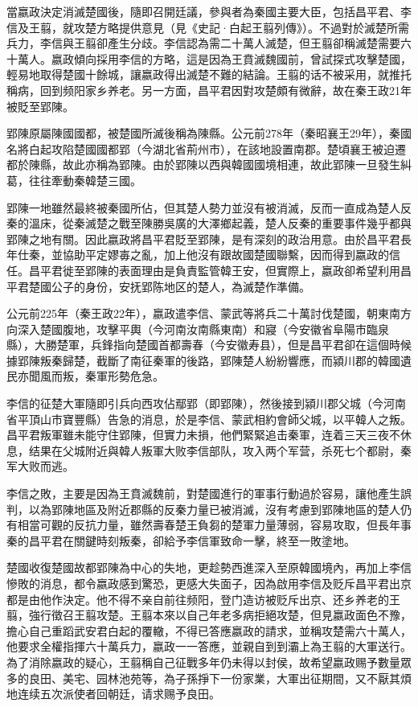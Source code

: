 當嬴政決定消滅楚國後，隨即召開廷議，參與者為秦國主要大臣，包括昌平君、李信及王翦，就攻楚方略提供意見（見《史記·白起王翦列傳》）。不過對於滅楚所需兵力，李信與王翦卻產生分歧。李信認為需二十萬人滅楚，但王翦卻稱滅楚需要六十萬人。嬴政傾向採用李信的方略，這是因為王賁滅魏國前，曾試探式攻擊楚國，輕易地取得楚國十餘城，讓嬴政得出滅楚不難的結論。王翦的话不被采用，就推托稱病，回到频阳家乡养老。另一方面，昌平君因對攻楚頗有微辭，故在秦王政21年被貶至郢陳。

郢陳原屬陳國國都，被楚國所滅後稱為陳縣。公元前278年（秦昭襄王29年），秦國名將白起攻陷楚國國都郢（今湖北省荊州市），在該地設置南郡。楚頃襄王被迫遷都於陳縣，故此亦稱為郢陳。由於郢陳以西與韓國國境相連，故此郢陳一旦發生糾葛，往往牽動秦韓楚三國。

郢陳一地雖然最終被秦國所佔，但其楚人勢力並沒有被消滅，反而一直成為楚人反秦的溫床，從秦滅楚之戰至陳勝吳廣的大澤鄉起義，楚人反秦的重要事件幾乎都與郢陳之地有關。因此嬴政將昌平君貶至郢陳，是有深刻的政治用意。由於昌平君長年仕秦，並協助平定嫪毐之亂，加上他沒有跟故國楚國聯繫，因而得到嬴政的信任。昌平君徙至郢陳的表面理由是負責監管韓王安，但實際上，嬴政卻希望利用昌平君楚國公子的身份，安抚郢陈地区的楚人，為滅楚作準備。

公元前225年（秦王政22年），嬴政遣李信、蒙武等將兵二十萬討伐楚國，朝東南方向深入楚國腹地，攻擊平輿（今河南汝南縣東南）和寢（今安徽省阜陽市臨泉縣），大勝楚軍，兵鋒指向楚國首都壽春（今安徽寿县），但是昌平君卻在這個時候據郢陳叛秦歸楚，截斷了南征秦軍的後路，郢陳楚人紛紛響應，而潁川郡的韓國遺民亦聞風而叛，秦軍形勢危急。

李信的征楚大軍隨即引兵向西攻佔鄢郢（即郢陳），然後接到潁川郡父城（今河南省平頂山市寶豐縣）告急的消息，於是李信、蒙武相約會師父城，以平韓人之叛。昌平君叛軍雖未能守住郢陳，但實力未損，他們緊緊追击秦軍，连着三天三夜不休息，结果在父城附近與韓人叛軍大败李信部队，攻入两个军营，杀死七个都尉，秦军大败而逃。

李信之敗，主要是因為王賁滅魏前，對楚國進行的軍事行動過於容易，讓他產生誤判，以為郢陳地區及附近郡縣的反秦力量已被消滅，沒有考慮到郢陳地區的楚人仍有相當可觀的反抗力量，雖然壽春楚王負芻的楚軍力量薄弱，容易攻取，但長年事秦的昌平君在關鍵時刻叛秦，卻給予李信軍致命一擊，終至一敗塗地。

楚國收復楚國故都郢陳為中心的失地，更趁勢西進深入至原韓國境內，再加上李信慘敗的消息，都令嬴政感到驚恐，更感大失面子，因為啟用李信及贬斥昌平君出京都是由他作決定。他不得不亲自前往频阳，登门造访被贬斥出京、还乡养老的王翦，強行徵召王翦攻楚。王翦本來以自己年老多病拒絕攻楚，但見嬴政面色不豫，擔心自己重蹈武安君白起的覆轍，不得已答應嬴政的請求，並稱攻楚需六十萬人，他要求全權指揮六十萬兵力，嬴政一一答應，並親自到到灞上為王翦的大軍送行。為了消除嬴政的疑心，王翦稱自己征戰多年仍未得以封侯，故希望嬴政赐予數量眾多的良田、美宅、园林池苑等，為子孫掙下一份家業，大軍出征期間，又不厭其煩地连续五次派使者回朝廷，请求赐予良田。

